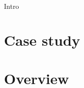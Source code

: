 Intro

\section*{Case study}
\label{sec:intro:case_study}%

\section*{Overview}
\label{sec:intro:overview}%